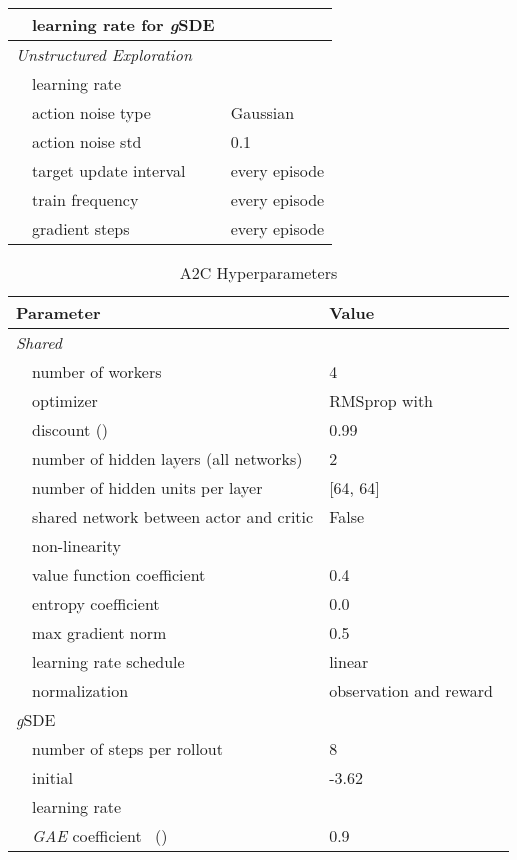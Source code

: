 \documentclass{article}
\newcommand{\ourSDE}{\textit{g}\textsc{SDE}\xspace}
\newcommand{\aac}{\textsc{A2C}\xspace}
\begin{document}
\begin{table}[h]
\begin{tabular}{@{}l l| l@{}}
    & learning rate for \ourSDE & \\
    \midrule
    \multicolumn{2}{l|}{\textit{Unstructured Exploration}}& \\
    & learning rate & \\
    & action noise type & Gaussian\\
    & action noise std & 0.1 \\
    & target update interval & every episode\\
    & train frequency & every episode\\
    & gradient steps & every episode\\
    \bottomrule
  \end{tabular}
\end{table}


\begin{table}[h]
\renewcommand{\arraystretch}{1.1}
\centering
\caption{\aac Hyperparameters}
\label{tab:a2c_shared_params}
\vspace{1mm}
  \begin{tabular}{@{}l l| l@{}}
    \toprule
    \multicolumn{2}{l|}{Parameter} &  Value\\
    \midrule
    \multicolumn{2}{l|}{\textit{Shared}}& \\
    & number of workers &  4\\
    & optimizer & RMSprop with \\
    & discount () &  0.99\\
    & number of hidden layers (all networks) & 2\\
    & number of hidden units per layer & [64, 64]\\
    & shared network between actor and critic & False\\
    & non-linearity & \\
    & value function coefficient & 0.4\\
    & entropy coefficient & 0.0\\
    & max gradient norm & 0.5\\
    & learning rate schedule & linear \\
    & normalization & observation and reward~\citep{hill2018stable}\\
    \midrule
    \multicolumn{2}{l|}{\ourSDE}& \\
    & number of steps per rollout &  8\\
    & initial  & -3.62\\
    & learning rate & \\
    & \textit{GAE} coefficient~\citep{schulman2015high} () &  0.9\\

\end{tabular}
\end{table}
\end{document}
